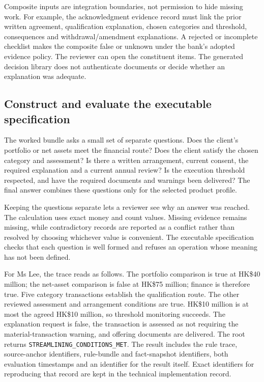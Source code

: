 Composite inputs are integration boundaries, not permission to hide missing
work. For example, the acknowledgment evidence record must link the prior
written agreement, qualification explanation, chosen categories and threshold,
consequences and withdrawal/amendment explanations. A rejected or incomplete
checklist makes the composite false or unknown under the bank's adopted evidence
policy. The reviewer can open the constituent items. The generated decision
library does not authenticate documents or decide whether an explanation was
adequate.

\subsection{Construct and evaluate the executable specification}
\label{merge:P-01b-complete-dry-run:04}


The worked bundle asks a small set of separate questions. Does the client's
portfolio or net assets meet the financial route? Does the client satisfy the
chosen category and assessment? Is there a written arrangement, current consent,
the required explanation and a current annual review? Is the execution threshold
respected, and have the required documents and warnings been delivered? The
final answer combines these questions only for the selected product profile.

Keeping the questions separate lets a reviewer see why an answer was reached.
The calculation uses exact money and count values. Missing evidence remains
missing, while contradictory records are reported as a conflict rather than
resolved by choosing whichever value is convenient. The executable specification
checks that each question is well formed and refuses an operation whose meaning
has not been defined.

For Ms Lee, the trace reads as follows. The portfolio comparison is true at
HK\$40 million; the net-asset comparison is false at HK\$75 million; finance
is therefore true. Five category transactions establish the qualification route.
The other reviewed assessment and arrangement conditions are true. HK\$10
million is at most the agreed HK\$10 million, so threshold monitoring succeeds.
The explanation request is false, the transaction is assessed as not requiring
the material-transaction warning, and offering documents are delivered. The root
returns \texttt{STREAMLINING\_CONDITIONS\_MET}. The result includes the rule
trace, source-anchor identifiers, rule-bundle and fact-snapshot identifiers, both
evaluation timestamps and an identifier for the result itself. Exact identifiers
for reproducing that record are kept in the technical implementation record.

